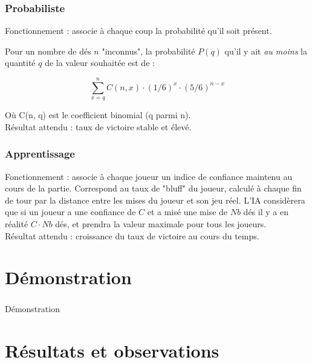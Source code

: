 \documentclass{beamer}
\begin{document}
\begin{frame}
  \frametitle{Probabiliste}

  Fonctionnement : associe à chaque coup la probabilité qu'il soit présent.

  Pour un nombre de dés $n$ "inconnus", la probabilité $P(q)$ qu'il y ait
  \emph{au moins} la quantité $q$ de la valeur souhaitée est de :

  $$
  \sum\limits_{x=q}^n C(n, x) \cdot (1/6)^x \cdot (5/6)^{n-x}
  $$

  Où C(n, q) est le coefficient binomial (q parmi n).
  \\[1cm]

  Résultat attendu : taux de victoire stable et élevé.
\end{frame}

\begin{frame}
  \frametitle{Apprentissage}

  Fonctionnement : associe à chaque joueur un indice de confiance maintenu au
  cours de la partie. Correspond au taux de "bluff" du joueur, calculé à chaque
  fin de tour par la distance entre les mises du joueur et son jeu réel. L'IA
  considèrera que si un joueur a une confiance de $C$ et a misé une mise de
  $Nb$ dés il y a en réalité $C \cdot Nb$ dés, et prendra la valeur maximale
  pour tous les joueurs.
  \\[1cm]
  Résultat attendu : croissance du taux de victoire au cours du temps.
\end{frame}

\section{Démonstration}
\begin{frame}
  \frametitle{}

  \begin{center}
    Démonstration
  \end{center}
\end{frame}

\section{Résultats et observations}
\end{document}
